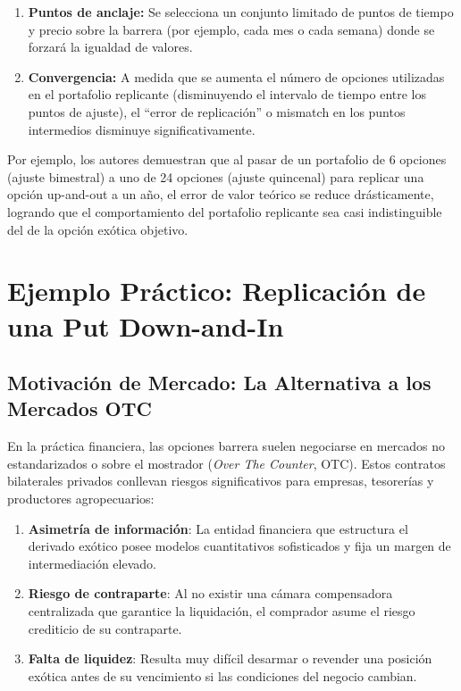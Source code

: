 \begin{enumerate} 
  \item \textbf{Puntos de anclaje:} Se selecciona un conjunto limitado de puntos de tiempo y precio sobre la barrera (por ejemplo, cada mes o cada semana) donde se forzará la igualdad de valores. 
  
  \item \textbf{Convergencia:} A medida que se aumenta el número de opciones utilizadas en el portafolio replicante (disminuyendo el intervalo de tiempo entre los puntos de ajuste), el ``error de replicación'' o mismatch en los puntos intermedios disminuye significativamente. 
\end{enumerate}

Por ejemplo, los autores demuestran que al pasar de un portafolio de 6 opciones (ajuste bimestral) a uno de 24 opciones (ajuste quincenal) para replicar una opción up-and-out a un año, el error de valor teórico se reduce drásticamente, logrando que el comportamiento del portafolio replicante sea casi indistinguible del de la opción exótica objetivo.

\section{Ejemplo Práctico: Replicación de una Put Down-and-In}
\label{sec:ejemplo_replicacion_estatica}

\subsection{Motivación de Mercado: La Alternativa a los Mercados OTC}

En la práctica financiera, las opciones barrera suelen negociarse en mercados no estandarizados o sobre el mostrador (\textit{Over The Counter}, OTC). Estos contratos bilaterales privados conllevan riesgos significativos para empresas, tesorerías y productores agropecuarios:
\begin{enumerate}
    \item \textbf{Asimetría de información}: La entidad financiera que estructura el derivado exótico posee modelos cuantitativos sofisticados y fija un margen de intermediación elevado.
    \item \textbf{Riesgo de contraparte}: Al no existir una cámara compensadora centralizada que garantice la liquidación, el comprador asume el riesgo crediticio de su contraparte.
    \item \textbf{Falta de liquidez}: Resulta muy difícil desarmar o revender una posición exótica antes de su vencimiento si las condiciones del negocio cambian.
\end{enumerate}

